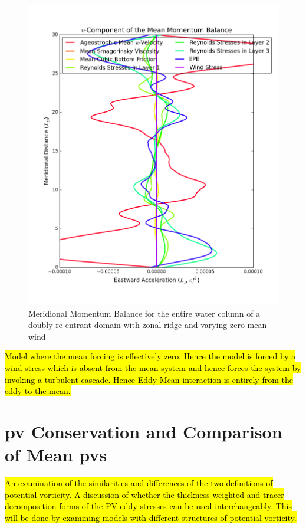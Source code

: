 \documentclass[12pt,a4paper]{report}
\begin{document}
\begin{figure}
\begin{minipage}[b]{0.45\linewidth}
 		\includegraphics[width=\linewidth ]{vmom_4}
 		\caption{Meridional Momentum Balance for the entire water column of 
 			a doubly re-entrant domain with 
 			zonal ridge and varying zero-mean wind}
 		\label{fig:vmomtotal}
 	\end{minipage}
 \end{figure}
 	

\hl{Model where the mean forcing is effectively zero. 
Hence the model is forced by a wind stress which is
absent from the mean system and hence forces the
system by 
invoking a turbulent cascade. Hence Eddy-Mean
interaction is entirely from the eddy to the mean.}

\section{\gls{pv} Conservation and Comparison of Mean \glspl{pv}}

\hl{An examination of the similarities and differences
of the two definitions of potential vorticity. 
A discussion of whether the thickness
weighted and tracer decomposition forms of the
PV eddy stresses can be used interchangeably.
This will be done by examining models with
different structures of potential vorticity.}
\end{document}
